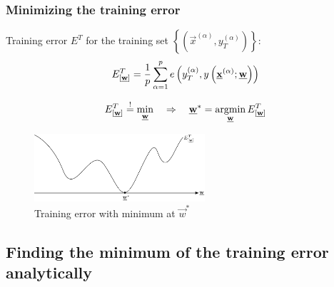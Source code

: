 \begin{frame}\frametitle{Minimizing the training error}
	Training error $E^T$ for the training set $\left\{(\vec x^{(\alpha)}, y^{(\alpha)}_{T})\right\}$: 
    \begin{equation}
        {E}^T_{[\underline{\mathbf{w}}]} = \frac{1}{p} \sum\limits_{\alpha = 1}^p 
					e\left(y^{(\alpha)}_T, y\left(\underline{\mathbf{x}}^{(\alpha)}; \underline{\mathbf{w}}\right)\right)
    \end{equation}
    
    
    \begin{equation}
        \ETw \eqexcl \min_{\vec w} \quad \Rightarrow \quad \vec w^{*} = \argmin_{\vec w} \ETw
    \end{equation}

    \begin{figure}[h]
        \centering
        \includegraphics[height=2.5cm]{img/section1_fig19_no_steps}
        \caption{Training error with minimum at $\vec w^{*}$}
        \label{fig:training_error} 
    \end{figure}
    \slidesonly{\vspace{-10mm}}
    
    \pause 

\end{frame}

\subsection{Finding the minimum of the training error analytically}

